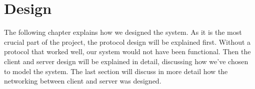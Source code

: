 \chapter{Design}
\label{design}

The following chapter explains how we designed the system. As it is the most crucial part of the project, the protocol design will be explained first. Without a protocol that worked well, our system would not have been functional. Then the client and server design will be explained in detail, discussing how we've chosen to model the system. The last section will discuss in more detail how the networking between client and server was designed.









